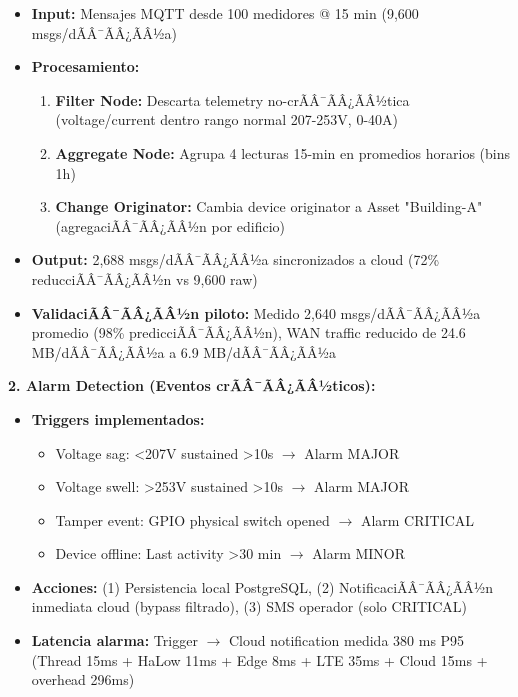 \begin{itemize}
    \item \textbf{Input:} Mensajes MQTT desde 100 medidores @ 15 min (9,600 msgs/dÃÂ¯ÃÂ¿ÃÂ½a)
    \item \textbf{Procesamiento:}
    \begin{enumerate}
        \item \textbf{Filter Node:} Descarta telemetry no-crÃÂ¯ÃÂ¿ÃÂ½tica (voltage/current dentro rango normal 207-253V, 0-40A)
        \item \textbf{Aggregate Node:} Agrupa 4 lecturas 15-min en promedios horarios (bins 1h)
        \item \textbf{Change Originator:} Cambia device originator a Asset "Building-A" (agregaciÃÂ¯ÃÂ¿ÃÂ½n por edificio)
    \end{enumerate}
    \item \textbf{Output:} 2,688 msgs/dÃÂ¯ÃÂ¿ÃÂ½a sincronizados a cloud (72\% reducciÃÂ¯ÃÂ¿ÃÂ½n vs 9,600 raw)
    \item \textbf{ValidaciÃÂ¯ÃÂ¿ÃÂ½n piloto:} Medido 2,640 msgs/dÃÂ¯ÃÂ¿ÃÂ½a promedio (98\% predicciÃÂ¯ÃÂ¿ÃÂ½n), WAN traffic reducido de 24.6 MB/dÃÂ¯ÃÂ¿ÃÂ½a a 6.9 MB/dÃÂ¯ÃÂ¿ÃÂ½a
\end{itemize}

\textbf{2. Alarm Detection (Eventos crÃÂ¯ÃÂ¿ÃÂ½ticos):}

\begin{itemize}
    \item \textbf{Triggers implementados:}
    \begin{itemize}
        \item Voltage sag: <207V sustained >10s $\rightarrow$ Alarm MAJOR
        \item Voltage swell: >253V sustained >10s $\rightarrow$ Alarm MAJOR  
        \item Tamper event: GPIO physical switch opened $\rightarrow$ Alarm CRITICAL
        \item Device offline: Last activity >30 min $\rightarrow$ Alarm MINOR
    \end{itemize}
    \item \textbf{Acciones:} (1) Persistencia local PostgreSQL, (2) NotificaciÃÂ¯ÃÂ¿ÃÂ½n inmediata cloud (bypass filtrado), (3) SMS operador (solo CRITICAL)
    \item \textbf{Latencia alarma:} Trigger $\rightarrow$ Cloud notification medida 380 ms P95 (Thread 15ms + HaLow 11ms + Edge 8ms + LTE 35ms + Cloud 15ms + overhead 296ms)
\end{itemize}

